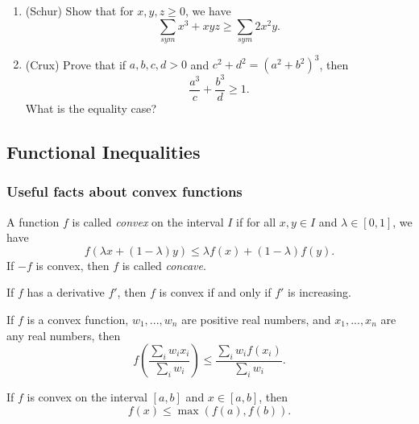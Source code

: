 \begin{enumerate}
\item (Schur) Show that for $x,y,z\ge 0$, we have
\[
\sum_{sym} x^3+xyz \ge \sum_{sym} 2x^2y.
\]

\item (Crux) Prove that if $a,b,c,d > 0$ and $c^2+d^2 = (a^2+b^2)^3$, then
\[
\frac{a^3}{c} + \frac{b^3}{d} \ge 1.
\]
What is the equality case?

\begin{comment}
\item (Crux) Prove that for all $n$ and all $0 < a_1 \le \cdots \le a_n$, we have
\[
\frac{1}{2n^2}\frac{\sum_{i<j}(a_j-a_i)^2}{a_n} \le \frac{\sum_i a_i}{n}-\sqrt[n]{a_1\cdots a_n} \le \frac{1}{2n^2}\frac{\sum_{i<j}(a_j-a_i)^2}{a_1}.
\]
\end{comment}
\end{enumerate}

\subsection{Functional Inequalities}

\subsubsection{Useful facts about convex functions}

\begin{defn} A function $f$ is called \emph{convex} on the interval $I$ if for all $x,y\in I$ and $\lambda\in [0,1]$, we have
\[
f(\lambda x + (1-\lambda)y) \le \lambda f(x) + (1-\lambda)f(y).
\]
If $-f$ is convex, then $f$ is called \emph{concave}.
\end{defn}

\begin{thm} If $f$ has a derivative $f'$, then $f$ is convex if and only if $f'$ is increasing.
\end{thm}

\begin{thm} If $f$ is a convex function, $w_1, ..., w_n$ are positive real numbers, and $x_1, ..., x_n$ are any real numbers, then
\[
f\left(\frac{\sum_i w_ix_i}{\sum_i w_i}\right) \le \frac{\sum_i w_if(x_i)}{\sum_i w_i}.
\]
\end{thm}

\begin{prop} If $f$ is convex on the interval $[a,b]$ and $x \in [a,b]$, then
\[
f(x) \le \max(f(a),f(b)).
\]
\end{prop}

